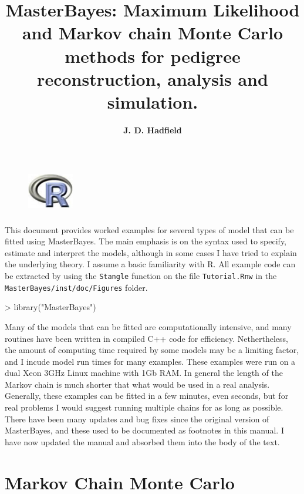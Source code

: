 \documentclass{article}
\title{\bf{\Large{MasterBayes: Maximum Likelihood and Markov chain Monte Carlo methods for pedigree reconstruction, analysis and simulation.}}}
\author{\bf{\large{J. D. Hadfield}}}
\begin{document}
\maketitle
\begin{figure}[!h]
\begin{center}
\includegraphics[height=2cm, width=2cm]{Rlogo}
\end{center}
\end{figure}

\newpage

\tableofcontents

\newpage

This document provides worked examples for several types of model that can be fitted using MasterBayes.  The main emphasis is on the syntax used to specify, estimate and interpret the models, although in some cases I have tried to explain the underlying theory.  I assume a basic familiarity with R.  All example code can be extracted by using the \texttt{Stangle} function on the file \texttt{Tutorial.Rnw} in the \texttt{MasterBayes/inst/doc/Figures} folder.

\begin{Schunk}
\begin{Sinput}
> library("MasterBayes")
\end{Sinput}
\end{Schunk}

Many of the models that can be fitted are computationally intensive, and many routines have been written in compiled C++ code for efficiency.  Nethertheless, the amount of computing time required by some models may be a limiting factor, and I incude model run times for many examples.  These examples were run on a dual Xeon 3GHz Linux machine with 1Gb RAM. In general the length of the Markov chain is much shorter that what would be used in a real analysis.  Generally, these examples can be fitted in a few minutes, even seconds, but for real problems I would suggest running multiple chains for as long as possible.  There have been many updates and bug fixes since the original version of MasterBayes, and these used to be documented as footnotes in this manual. I have now updated the manual and absorbed them into the body of the text.   


\section{\large{Markov Chain Monte Carlo}}
\label{MCMC-sec}
\end{document}

